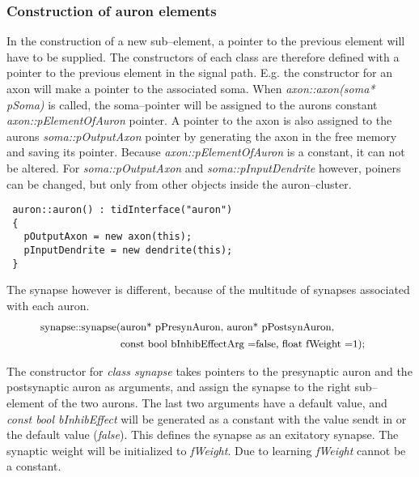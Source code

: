 	\subsubsection{Construction of auron elements} %
	In the construction of a new sub--element, a pointer to the previous element will have to be supplied. 
	The constructors of each class are therefore defined with a pointer to the previous element in the signal path. E.g. the constructor for an axon will make a pointer to the associated soma. 
	When \emph{axon::axon(soma* pSoma)} is called, the soma--pointer will be assigned to the aurons constant \emph{axon::pElementOfAuron} pointer.
	A pointer to the axon is also assigned to the aurons \emph{soma::pOutputAxon} pointer by generating the axon in the free memory and saving its pointer.
	Because \emph{axon::pElementOfAuron} is a constant, it can not be altered. For \emph{soma::pOutputAxon} and \emph{soma::pInputDendrite} however, poiners can be changed, but only from other objects inside the auron--cluster.


\begin{lstlisting}
 auron::auron() : tidInterface("auron")
 {
   pOutputAxon = new axon(this);         
   pInputDendrite = new dendrite(this);
 }
\end{lstlisting}

	The synapse however is different, because of the multitude of synapses associated with each auron. 
	\begin{equation} \nonumber
		\begin{split}
			\text{\small{synapse::synapse(}} &\text{\small{auron* pPresynAuron, auron* pPostsynAuron,}} \qquad \qquad\\
													&\text{\small{const bool bInhibEffectArg =false, float fWeight =1);}}
		\end{split} %
	\end{equation} %
			
	The constructor for \emph{class synapse} takes pointers to the presynaptic auron and the postsynaptic auron as arguments, and assign the synapse to the right sub--element of the two aurons. 
	The last two arguments have a default value, and \emph{const bool bInhibEffect} will be generated as a constant with the value sendt in or the default value (\emph{false}). This defines the synapse as an exitatory synapse. 
	The synaptic weight will be initialized to \emph{fWeight}. Due to learning \emph{fWeight} cannot be a constant.



